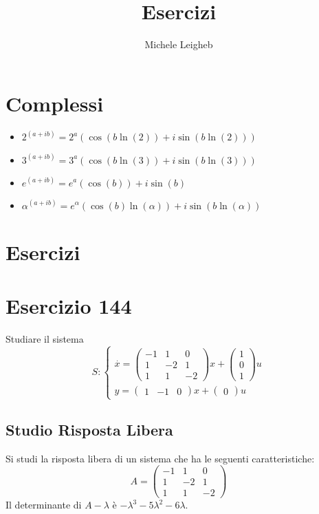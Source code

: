 \documentclass{article}
\title{Esercizi}
\author{Michele Leigheb}
\date{}
\begin{document}
\maketitle
\tableofcontents{}
\section{Complessi}
\begin{itemize}
	\item \(\displaystyle 2^{(a+ib)} = 2^a (\cos(b \ln(2)) + i\sin(b \ln(2))) \)
	\item \(\displaystyle 3^{(a+ib)} = 3^a (\cos(b \ln(3)) + i\sin(b \ln(3))) \)
	\item \(\displaystyle e^{(a+ib)} = e^a (\cos(b)) + i\sin(b) \)
	\item \(\displaystyle \alpha^{(a+ib)} = e^{\alpha} (\cos(b)\ln(\alpha)) + i\sin(b\ln(\alpha)) \)
\end{itemize}



\section{Esercizi}

\section{Esercizio 144 }
 Studiare il sistema \[S:\begin{cases}\overset{\cdot}{x} = \left(\begin{matrix}-1 & 1 & 0\\1 & -2 & 1\\1 & 1 & -2\end{matrix}\right) x+ \left(\begin{matrix}1\\0\\1\end{matrix}\right)u\\y = \left(\begin{matrix}1 & -1 & 0\end{matrix}\right) x +\left(\begin{matrix}0\end{matrix}\right) u\end{cases}\]\subsection{Studio Risposta Libera}
Si studi la risposta libera di un sistema che ha le seguenti caratteristiche: \[A = \left(\begin{matrix}-1 & 1 & 0\\1 & -2 & 1\\1 & 1 & -2\end{matrix}\right)\]
Il determinante di $A-\lambda$ è $ - \lambda^{3} - 5 \lambda^{2} - 6 \lambda $.
\end{document}
